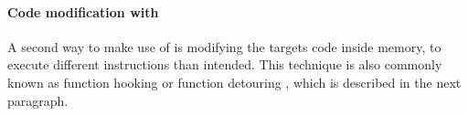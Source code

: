 \paragraph{Code modification with }
A second way to make use of  is modifying the targets code inside memory, to execute different instructions than intended. This technique is also commonly known as function hooking or function detouring \cite{codeproject_hooking}, which is described in the next paragraph. 